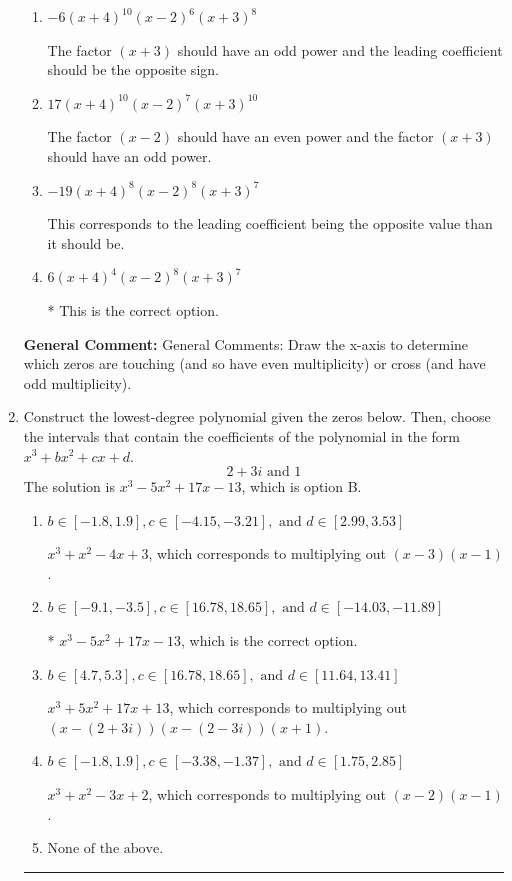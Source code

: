 \documentclass{extbook}[14pt]
\newcommand{\litem}[1]{\item #1

\rule{\textwidth}{0.4pt}}
\begin{document}
\begin{enumerate}
{\begin{enumerate}[label=\Alph*.]
The factor $(x - 2)$ should have an even power.
\item \( -6(x + 4)^{10} (x - 2)^{6} (x + 3)^{8} \)

The factor $(x + 3)$ should have an odd power and the leading coefficient should be the opposite sign.
\item \( 17(x + 4)^{10} (x - 2)^{7} (x + 3)^{10} \)

The factor $(x - 2)$ should have an even power and the factor $(x + 3)$ should have an odd power.
\item \( -19(x + 4)^{8} (x - 2)^{8} (x + 3)^{7} \)

This corresponds to the leading coefficient being the opposite value than it should be.
\item \( 6(x + 4)^{4} (x - 2)^{8} (x + 3)^{7} \)

* This is the correct option.
\end{enumerate}

\textbf{General Comment:} General Comments: Draw the x-axis to determine which zeros are touching (and so have even multiplicity) or cross (and have odd multiplicity).
}
\litem{
Construct the lowest-degree polynomial given the zeros below. Then, choose the intervals that contain the coefficients of the polynomial in the form $x^3+bx^2+cx+d$.
\[ 2 + 3 i \text{ and } 1 \]The solution is \( x^{3} -5 x^{2} +17 x -13 \), which is option B.\begin{enumerate}[label=\Alph*.]
\item \( b \in [-1.8, 1.9], c \in [-4.15, -3.21], \text{ and } d \in [2.99, 3.53] \)

$x^{3} + x^{2} -4 x + 3$, which corresponds to multiplying out $(x -3)(x -1)$.
\item \( b \in [-9.1, -3.5], c \in [16.78, 18.65], \text{ and } d \in [-14.03, -11.89] \)

* $x^{3} -5 x^{2} +17 x -13$, which is the correct option.
\item \( b \in [4.7, 5.3], c \in [16.78, 18.65], \text{ and } d \in [11.64, 13.41] \)

$x^{3} +5 x^{2} +17 x + 13$, which corresponds to multiplying out $(x-(2 + 3 i))(x-(2 - 3 i))(x + 1)$.
\item \( b \in [-1.8, 1.9], c \in [-3.38, -1.37], \text{ and } d \in [1.75, 2.85] \)

$x^{3} + x^{2} -3 x + 2$, which corresponds to multiplying out $(x -2)(x -1)$.
\item \( \text{None of the above.} \)


\end{enumerate}}
\end{enumerate}
\end{document}
